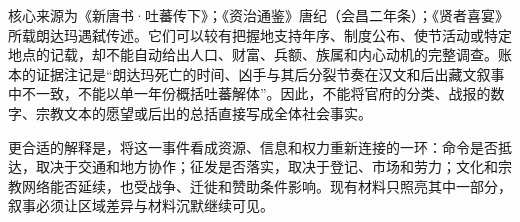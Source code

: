 核心来源为《新唐书·吐蕃传下》；《资治通鉴》唐纪（会昌二年条）；《贤者喜宴》所载朗达玛遇弑传述。它们可以较有把握地支持年序、制度公布、使节活动或特定地点的记载，却不能自动给出人口、财富、兵额、族属和内心动机的完整调查。账本的证据注记是“朗达玛死亡的时间、凶手与其后分裂节奏在汉文和后出藏文叙事中不一致，不能以单一年份概括吐蕃解体”。因此，不能将官府的分类、战报的数字、宗教文本的愿望或后出的总括直接写成全体社会事实。

更合适的解释是，将这一事件看成资源、信息和权力重新连接的一环：命令是否抵达，取决于交通和地方协作；征发是否落实，取决于登记、市场和劳力；文化和宗教网络能否延续，也受战争、迁徙和赞助条件影响。现有材料只照亮其中一部分，叙事必须让区域差异与材料沉默继续可见。
